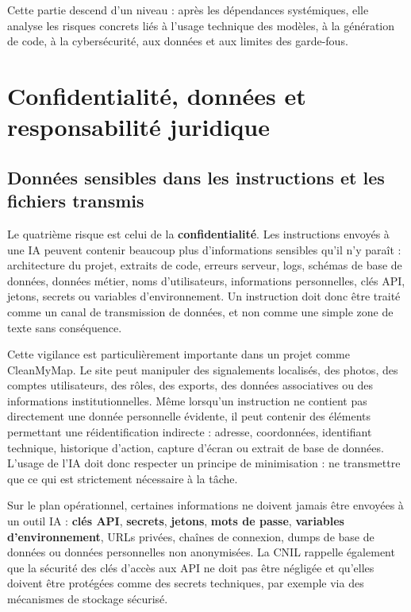 \documentclass[
  10pt,
  a4paper,
  DIV=11,
  numbers=noendperiod,
  oneside]{scrreprt}
\let\oldtextbf\textbf
\renewcommand{\textbf}[1]{\oldtextbf{\textcolor{cmmnavy}{#1}}}
\begin{document}
Cette partie descend d'un niveau : après les dépendances systémiques,
elle analyse les risques concrets liés à l'usage technique des modèles,
à la génération de code, à la cybersécurité, aux données et aux limites
des garde-fous.

\section{Confidentialité, données et responsabilité
juridique}\label{confidentialituxe9-donnuxe9es-et-responsabilituxe9-juridique}

\subsection{Données sensibles dans les instructions et les fichiers
transmis}\label{donnuxe9es-sensibles-dans-les-instructions-et-les-fichiers-transmis}

Le quatrième risque est celui de la \textbf{confidentialité}. Les
instructions envoyés à une IA peuvent contenir beaucoup plus
d'informations sensibles qu'il n'y paraît : architecture du projet,
extraits de code, erreurs serveur, logs, schémas de base de données,
données métier, noms d'utilisateurs, informations personnelles, clés
API, jetons, secrets ou variables d'environnement. Un instruction doit
donc être traité comme un canal de transmission de données, et non comme
une simple zone de texte sans conséquence.

Cette vigilance est particulièrement importante dans un projet comme
CleanMyMap. Le site peut manipuler des signalements localisés, des
photos, des comptes utilisateurs, des rôles, des exports, des données
associatives ou des informations institutionnelles. Même lorsqu'un
instruction ne contient pas directement une donnée personnelle évidente,
il peut contenir des éléments permettant une réidentification indirecte
: adresse, coordonnées, identifiant technique, historique d'action,
capture d'écran ou extrait de base de données. L'usage de l'IA doit donc
respecter un principe de minimisation : ne transmettre que ce qui est
strictement nécessaire à la tâche.

Sur le plan opérationnel, certaines informations ne doivent jamais être
envoyées à un outil IA : \textbf{clés API}, \textbf{secrets},
\textbf{jetons}, \textbf{mots de passe}, \textbf{variables
d'environnement}, URLs privées, chaînes de connexion, dumps de base de
données ou données personnelles non anonymisées. La CNIL rappelle
également que la sécurité des clés d'accès aux API ne doit pas être
négligée et qu'elles doivent être protégées comme des secrets
techniques, par exemple via des mécanismes de stockage sécurisé.
\end{document}

